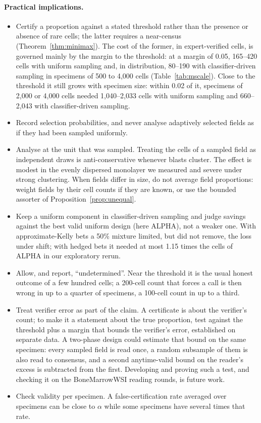\documentclass[11pt]{article}
\theoremstyle{remark}
\theoremstyle{definition}
\begin{document}
\paragraph{Practical implications.}
\begin{itemize}
\item Certify a proportion against a stated threshold rather than the presence or absence of rare cells; the latter requires a near-census (Theorem~\ref{thm:minimax}). The cost of the former, in expert-verified cells, is governed mainly by the margin to the threshold: at a margin of 0.05, 165--420 cells with uniform sampling and, in distribution, 80--190 with classifier-driven sampling in specimens of 500 to 4,000 cells (Table~\ref{tab:mscale}). Close to the threshold it still grows with specimen size: within 0.02 of it, specimens of 2,000 or 4,000 cells needed 1,040--2,033 cells with uniform sampling and 660--2,043 with classifier-driven sampling.
\item Record selection probabilities, and never analyse adaptively selected fields as if they had been sampled uniformly.
\item Analyse at the unit that was sampled. Treating the cells of a sampled field as independent draws is anti-conservative whenever blasts cluster. The effect is modest in the evenly dispersed monolayer we measured and severe under strong clustering. When fields differ in size, do not average field proportions: weight fields by their cell counts if they are known, or use the bounded assorter of Proposition~\ref{prop:unequal}.
\item Keep a uniform component in classifier-driven sampling and judge savings against the best valid uniform design (here ALPHA), not a weaker one. With approximate-Kelly bets a 50\% mixture limited, but did not remove, the loss under shift; with hedged bets it needed at most 1.15 times the cells of ALPHA in our exploratory rerun.
\item Allow, and report, ``undetermined''. Near the threshold it is the usual honest outcome of a few hundred cells; a 200-cell count that forces a call is then wrong in up to a quarter of specimens, a 100-cell count in up to a third.
\item Treat verifier error as part of the claim. A certificate is about the verifier's count; to make it a statement about the true proportion, test against the threshold plus a margin that bounds the verifier's error, established on separate data. A two-phase design could estimate that bound on the same specimen: every sampled field is read once, a random subsample of them is also read to consensus, and a second anytime-valid bound on the reader's excess is subtracted from the first. Developing and proving such a test, and checking it on the BoneMarrowWSI reading rounds, is future work.
\item Check validity per specimen. A false-certification rate averaged over specimens can be close to $\alpha$ while some specimens have several times that rate.
\end{itemize}
\end{document}
